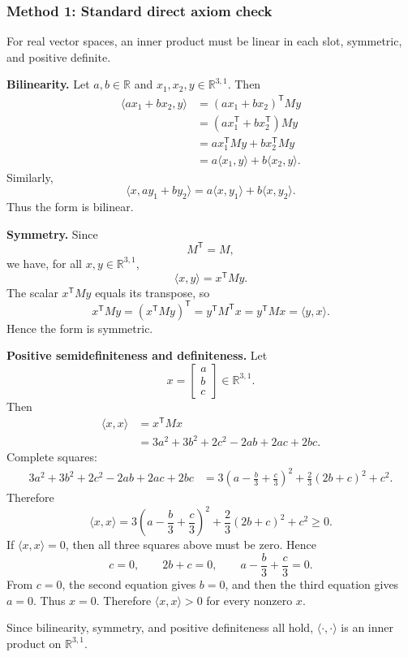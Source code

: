 \documentclass[12pt]{article}
\newcommand{\R}{\mathbb{R}}
\begin{document}
\subsubsection{Method 1: Standard direct axiom check}
For real vector spaces, an inner product must be linear in each slot, symmetric, and positive definite.

\medskip
\noindent\textbf{Bilinearity.}
Let $a,b\in\R$ and $x_1,x_2,y\in\R^{3,1}$. Then
\begin{align*}
\langle ax_1+bx_2,y\rangle
&=(ax_1+bx_2)^{\mathsf T}My\\
&=(a x_1^{\mathsf T}+b x_2^{\mathsf T})My\\
&=a x_1^{\mathsf T}My+b x_2^{\mathsf T}My\\
&=a\langle x_1,y\rangle+b\langle x_2,y\rangle.
\end{align*}
Similarly,
\[
\langle x,ay_1+by_2\rangle=a\langle x,y_1\rangle+b\langle x,y_2\rangle.
\]
Thus the form is bilinear.

\medskip
\noindent\textbf{Symmetry.}
Since
\[
M^{\mathsf T}=M,
\]
we have, for all $x,y\in\R^{3,1}$,
\[
\langle x,y\rangle=x^{\mathsf T}My.
\]
The scalar $x^{\mathsf T}My$ equals its transpose, so
\[
x^{\mathsf T}My=(x^{\mathsf T}My)^{\mathsf T}=y^{\mathsf T}M^{\mathsf T}x=y^{\mathsf T}Mx=\langle y,x\rangle.
\]
Hence the form is symmetric.

\medskip
\noindent\textbf{Positive semidefiniteness and definiteness.}
Let
\[
x=\begin{bmatrix}a\\b\\c\end{bmatrix}\in\R^{3,1}.
\]
Then
\begin{align*}
\langle x,x\rangle
&=x^{\mathsf T}Mx\\
&=3a^2+3b^2+2c^2-2ab+2ac+2bc.
\end{align*}
Complete squares:
\begin{align*}
3a^2+3b^2+2c^2-2ab+2ac+2bc
&=3\left(a-\frac{b}{3}+\frac{c}{3}\right)^2+\frac{2}{3}(2b+c)^2+c^2.
\end{align*}
Therefore
\[
\langle x,x\rangle=3\left(a-\frac{b}{3}+\frac{c}{3}\right)^2+\frac{2}{3}(2b+c)^2+c^2\ge 0.
\]
If $\langle x,x\rangle=0$, then all three squares above must be zero. Hence
\[
c=0,
\qquad
2b+c=0,
\qquad
a-\frac{b}{3}+\frac{c}{3}=0.
\]
From $c=0$, the second equation gives $b=0$, and then the third equation gives $a=0$. Thus $x=0$. Therefore $\langle x,x\rangle>0$ for every nonzero $x$.

Since bilinearity, symmetry, and positive definiteness all hold, $\langle\cdot,\cdot\rangle$ is an inner product on $\R^{3,1}$.
\end{document}
